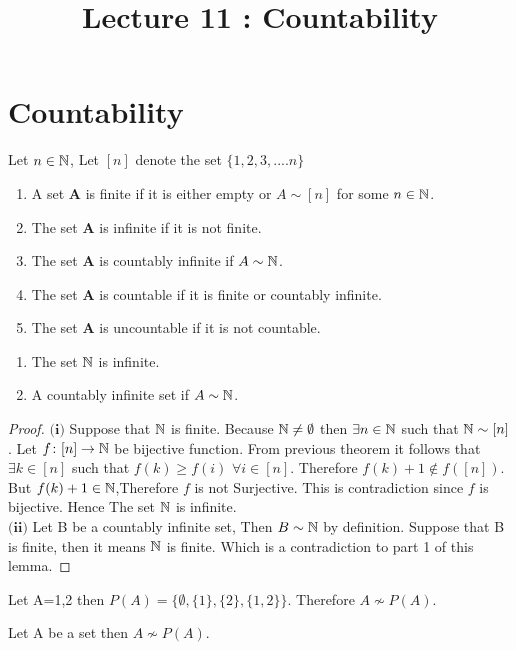 \documentclass[a4paper,english,12pt]{article}   	%
\title{Lecture 11 : Countability}
\author{}
\begin{document}
\maketitle

\section{Countability}
\begin{defn} Let $n \in \mathbb{N}$, Let $[n]$ denote the set $\{1,2,3,....n\}$
\begin{enumerate}
\item A set $\textbf{A}$ is finite if it is either empty or $A \sim [n]$ for some $n \in \mathbb{N}$.
\item The set $\textbf{A}$ is infinite if it is not finite.
\item The set $\textbf{A}$ is countably infinite if $A \sim \mathbb{N}$.
\item The set $\textbf{A}$ is countable if it is finite or countably infinite.
\item The set $\textbf{A}$ is uncountable if it is not countable.
\end{enumerate}
\end{defn}
\begin{lem} 
\begin{enumerate}
\item The set $\mathbb{N}$ is infinite.
\item A countably infinite set if $A \sim \mathbb{N}$.
\end{enumerate}
\end{lem}
\begin{proof} $\textbf{(i)}$ Suppose that $\mathbb{N}$ is finite. Because $\mathbb{N} \neq \emptyset$ then $\exists n \in \mathbb{N}$ such that $\mathbb{N} \sim [n]$.
Let $f \colon [n] \to \mathbb{N}$ be bijective function. From previous theorem it follows that $\exists k \in [n]$ such that $f(k) \geq f(i) $ $\forall i \in [n]$. Therefore 
$f(k)+1 \notin f([n])$. But $f(k)+1 \in \mathbb{N}$,Therefore $f$ is not Surjective. This is contradiction since $f$ is bijective. Hence The set $\mathbb{N}$ is infinite.\\
$\textbf{(ii)}$ Let B be a countably infinite set, Then $B \sim \mathbb{N}$ by definition. Suppose that B is finite, then it means  $\mathbb{N}$ is finite. Which is a contradiction to part 1 of this lemma.
\end{proof} 
\begin{exmp} Let A={1,2} then $P(A)=\{ \emptyset,\{1\},\{2\},\{1,2\}\}$. Therefore $A \nsim P(A) $.
\end{exmp}
\begin{thm} Let A be a set then $A \nsim P(A) $.
\end{thm}
\end{document}
